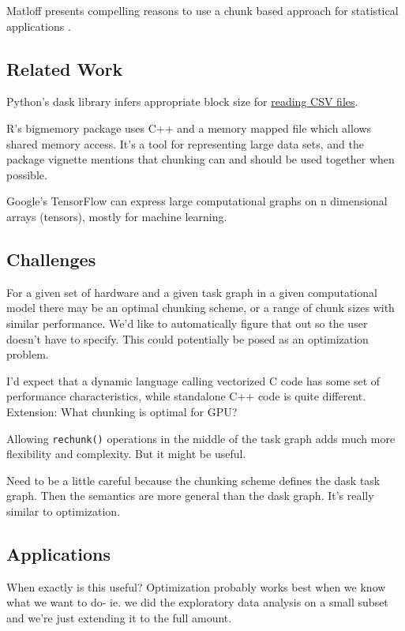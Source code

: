 \documentclass[12pt]{article}
\begin{document}
Matloff presents compelling reasons to use a chunk based
approach for statistical applications \cite{matloff2014software}.

\subsection{Related Work}

Python's dask library infers appropriate block size for
\href{https://github.com/dask/dask/pull/1328}{reading CSV files}.

R's bigmemory package uses C++ and a memory mapped file which allows shared
memory access. \cite{kane2010bigmemory} It's a tool for representing large
data sets, and the package vignette mentions that chunking can and should
be used together when possible.

Google's TensorFlow can express large computational graphs on n dimensional
arrays (tensors), mostly for machine learning.

\subsection{Challenges}

For a given set of hardware and a given task graph in a given
computational model there may be
an optimal chunking scheme, or a range of chunk sizes with similar performance.
We'd like to automatically figure that out so the user doesn't have to
specify. This could potentially be posed as an optimization problem.

I'd expect that a dynamic language calling vectorized C code has some set
of performance characteristics, while standalone C++ code is quite
different.
Extension: What chunking is optimal for GPU?

Allowing \texttt{rechunk()} operations in the middle of the task graph adds
much more flexibility and complexity. But it might be useful.

Need to be a little careful because the chunking scheme defines the dask
task graph. Then the semantics are more general than the dask graph. It's
really similar to optimization.

\subsection{Applications}

When exactly is this useful? Optimization probably works best when we know what we want
to do- ie. we did the exploratory data analysis on a small subset and we're
just extending it to the full amount.
\end{document}
